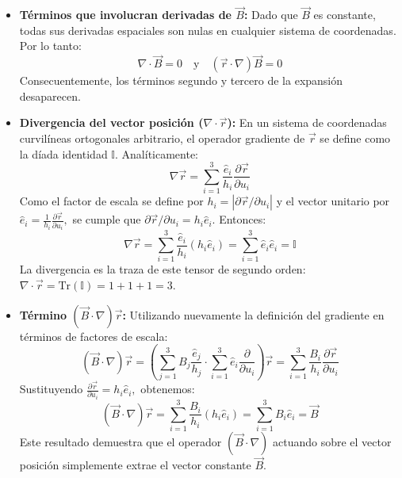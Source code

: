 \documentclass[a4paper]{article}
\begin{document}
\begin{itemize}
    \item \textbf{Términos que involucran derivadas de $\vec{B}$:} Dado que $\vec{B}$ es constante, todas sus derivadas espaciales son nulas en cualquier sistema de coordenadas. Por lo tanto:
    \begin{equation}
    \nabla \cdot \vec{B} = 0 \quad \text{y} \quad (\vec{r} \cdot \nabla)\vec{B} = 0
    \end{equation}
    Consecuentemente, los términos segundo y tercero de la expansión desaparecen.

    \item \textbf{Divergencia del vector posición ($\nabla \cdot \vec{r}$):} En un sistema de coordenadas curvilíneas ortogonales arbitrario, el operador gradiente de $\vec{r}$ se define como la díada identidad $\mathbb{I}$. Analíticamente:
    \begin{equation}
    \nabla \vec{r} = \sum_{i=1}^3 \frac{\hat{e}_i}{h_i} \frac{\partial \vec{r}}{\partial u_i}
    \end{equation}
    Como el factor de escala se define por $h_i = |\partial \vec{r} / \partial u_i|$ y el vector unitario por $\hat{e}_i = \frac{1}{h_i} \frac{\partial \vec{r}}{\partial u_i},$ se cumple que $\partial \vec{r} / \partial u_i = h_i \hat{e}_i$. Entonces:
    \begin{equation}
    \nabla \vec{r} = \sum_{i=1}^3 \frac{\hat{e}_i}{h_i} (h_i \hat{e}_i) = \sum_{i=1}^3 \hat{e}_i \hat{e}_i = \mathbb{I}
    \end{equation}
    La divergencia es la traza de este tensor de segundo orden: $\nabla \cdot \vec{r} = \text{Tr}(\mathbb{I}) = 1 + 1 + 1 = 3$.

    \item \textbf{Término $(\vec{B} \cdot \nabla)\vec{r}$:} Utilizando nuevamente la definición del gradiente en términos de factores de escala:
    \begin{equation}
    (\vec{B} \cdot \nabla)\vec{r} = \left( \sum_{j=1}^3 B_j \frac{\hat{e}_j}{h_j} \cdot \sum_{i=1}^3 \hat{e}_i \frac{\partial}{\partial u_i} \right) \vec{r} = \sum_{i=1}^3 \frac{B_i}{h_i} \frac{\partial \vec{r}}{\partial u_i}
    \end{equation}
    Sustituyendo $\frac{\partial \vec{r}}{\partial u_i} = h_i \hat{e}_i,$ obtenemos:
    \begin{equation}
    (\vec{B} \cdot \nabla)\vec{r} = \sum_{i=1}^3 \frac{B_i}{h_i} (h_i \hat{e}_i) = \sum_{i=1}^3 B_i \hat{e}_i = \vec{B}
    \end{equation}
    Este resultado demuestra que el operador $(\vec{B} \cdot \nabla)$ actuando sobre el vector posición simplemente extrae el vector constante $\vec{B}$.
\end{itemize}
\end{document}
